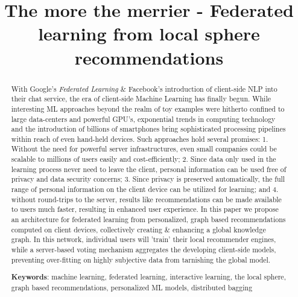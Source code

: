 \documentclass{llncs}
\begin{document}
\title{The more the merrier - Federated learning from local sphere recommendations}


	
\maketitle

\begin{abstract}
	
With Google's \textit{Federated Learning} \& Facebook's introduction of client-side NLP into their chat service, the era of client-side Machine Learning has finally begun. While interesting ML approaches beyond the realm of toy examples were hitherto confined to large data-centers and powerful GPU's, exponential trends in computing technology and the introduction of billions of smartphones bring sophisticated processing pipelines within reach of even hand-held devices. Such approaches hold several promises: 1. Without the need for powerful server infrastructures, even small companies could be scalable to millions of users easily and cost-efficiently; 2. Since data only used in the learning process never need to leave the client, personal information can be used free of privacy and data security concerns; 3. Since privacy is preserved automatically, the full range of personal information on the client device can be utilized for learning; and 4. without round-trips to the server, results like recommendations can be made available to users much faster, resulting in enhanced user experience. In this paper we propose an architecture for federated learning from personalized, graph based recommendations computed on client devices, collectively creating \& enhancing a global knowledge graph. In this network, individual users will 'train' their local recommender engines, while a server-based voting mechanism aggregates the developing client-side models, preventing over-fitting on highly subjective data from tarnishing the global model.

\medskip

\textbf{Keywords}: machine learning, federated learning, interactive learning, the local sphere, graph based recommendations, personalized ML models, distributed bagging


\end{abstract}
\end{document}
